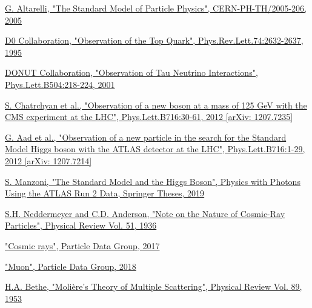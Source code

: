 \documentclass[a4paper, 11pt, twoside, openright]{report}
\begin{document}
  
  


\begin{thebibliography}{1}

\href{https://arxiv.org/abs/hep-ph/0510281}{G. Altarelli,
"The Standard Model of Particle Physics",
CERN-PH-TH/2005-206, 2005}

\href{https://arxiv.org/abs/hep-ex/9503003}{D0 Collaboration,
"Observation of the Top Quark",
Phys.Rev.Lett.74:2632-2637, 1995}

\href{https://arxiv.org/abs/hep-ex/0012035}{DONUT Collaboration, 
"Observation of Tau Neutrino Interactions",
Phys.Lett.B504:218-224, 2001}

\href{https://arxiv.org/abs/1207.7235}{S. Chatrchyan et al.,
"Observation of a new boson at a mass of 125 GeV with the CMS experiment at the LHC",
Phys.Lett.B716:30-61, 2012 [arXiv: 1207.7235]
}

\href{https://arxiv.org/abs/1207.7214}{G. Aad et al.,
"Observation of a new particle in the search for the Standard Model Higgs boson with the ATLAS detector at the LHC", 
Phys.Lett.B716:1-29, 2012 [arXiv: 1207.7214]}

\href{https://link.springer.com/chapter/10.1007/978-3-030-24370-8_2#citeas}{S. Manzoni, 
"The Standard Model and the Higgs Boson",
Physics with Photons Using the ATLAS Run 2 Data, Springer Theses, 2019
}

\href{http://web.ihep.su/dbserv/compas/src/neddermeyer37/eng.pdf}{S.H. Neddermeyer and C.D. Anderson,
"Note on the Nature of Cosmic-Ray Particles", 
Physical Review Vol. 51, 1936}

\href{http://pdg.lbl.gov/2017/reviews/rpp2017-rev-cosmic-rays.pdf}{
"Cosmic rays", Particle Data Group, 2017}

\href{http://pdg.lbl.gov/2018/listings/rpp2018-list-muon.pdf}{
"Muon", Particle Data Group, 2018}

\href{https://journals.aps.org/pr/abstract/10.1103/PhysRev.89.1256}{H.A. Bethe,
"Moli\`ere's Theory of Multiple Scattering", 
Physical Review Vol. 89, 1953}


\end{thebibliography}
\end{document}
